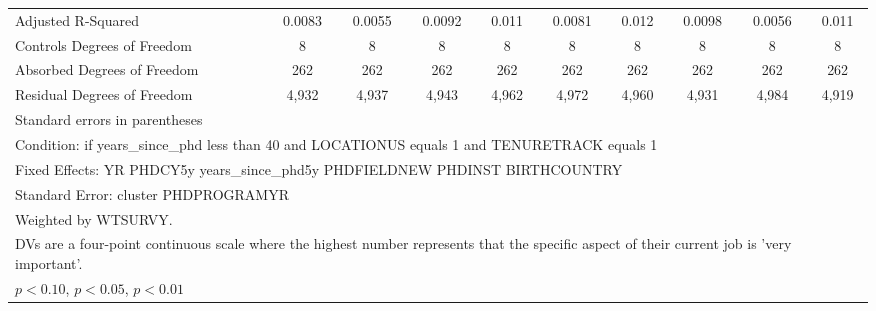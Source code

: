 \begin{table}[htbp]
\begin{tabular}{l*{9}{c}}
Adjusted R-Squared&      0.0083         &      0.0055         &      0.0092         &       0.011         &      0.0081         &       0.012         &      0.0098         &      0.0056         &       0.011         \\
Controls Degrees of Freedom&           8         &           8         &           8         &           8         &           8         &           8         &           8         &           8         &           8         \\
Absorbed Degrees of Freedom&         262         &         262         &         262         &         262         &         262         &         262         &         262         &         262         &         262         \\
Residual Degrees of Freedom&       4,932         &       4,937         &       4,943         &       4,962         &       4,972         &       4,960         &       4,931         &       4,984         &       4,919         \\
\hline\hline
\multicolumn{10}{l}{\footnotesize Standard errors in parentheses}\\
\multicolumn{10}{l}{\footnotesize Condition: if years\_since\_phd less than 40 and LOCATIONUS equals 1 and TENURETRACK equals 1}\\
\multicolumn{10}{l}{\footnotesize Fixed Effects: YR PHDCY5y years\_since\_phd5y PHDFIELDNEW PHDINST BIRTHCOUNTRY}\\
\multicolumn{10}{l}{\footnotesize Standard Error: cluster PHDPROGRAMYR}\\
\multicolumn{10}{l}{\footnotesize Weighted by WTSURVY.}\\
\multicolumn{10}{l}{\footnotesize DVs are a four-point continuous scale where the highest number represents that the specific aspect of their current job is 'very important'.}\\
\multicolumn{10}{l}{\footnotesize \sym{*} \(p<0.10\), \sym{**} \(p<0.05\), \sym{***} \(p<0.01\)}\\
\end{tabular}
\end{table}
